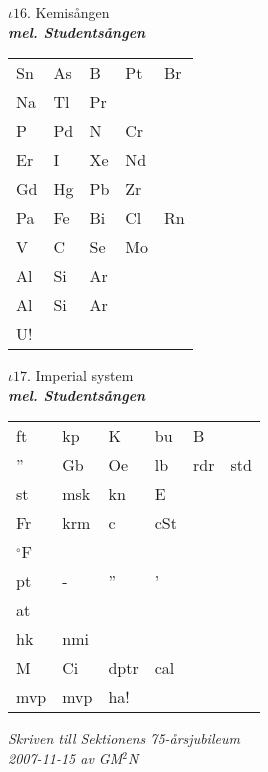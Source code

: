 \documentclass[a6paper,10pt]{article}
\newcommand{\mel}[1]{\small\textbf{\textit{mel. #1 \\}}}
\begin{document}
\begin{center}
\Large $\iota16$. Kemisången \\ 
\mel{Studentsången}
\end{center}
\vspace{-10pt}
\begin{table}[!h]
\begin{tabularx}{0.8\textwidth}{X X X X X}
 Sn&As&B&Pt&Br
\vspace{2pt} \\
 Na & Tl & Pr 
\vspace{2pt} \\
  P & Pd & N & Cr
\vspace{2pt} \\
Er & I & Xe & Nd
\vspace{2pt} \\
Gd&Hg&Pb&Zr
\vspace{2pt} \\
Pa&Fe&Bi&Cl&Rn
\vspace{2pt} \\
V&C&Se&Mo
\vspace{2pt} \\
Al &Si&Ar
\vspace{2pt} \\
Al &Si&Ar
\vspace{2pt} \\
U!
\end{tabularx}
\end{table}
\vspace{-10pt}
\begin{center}
\Large $\iota17$. Imperial system \\ 
\mel{Studentsången}
\end{center}
\vspace{-10pt}
\begin{table}[!h]
\begin{tabularx}{0.8\textwidth}{X X X X X X}
 ft&kp&K&bu&B
\vspace{2pt} \\
 '' &Gb & Oe & lb&rdr&std 
\vspace{2pt} \\
st&msk&kn&E
\vspace{2pt} \\
Fr&krm&c&cSt
\vspace{2pt} \\
$^{\circ}$F
\vspace{2pt} \\
pt&-&''&'
\vspace{2pt} \\
at
\vspace{2pt} \\
hk&nmi \\
M&Ci&dptr&cal
\vspace{2pt} \\
mvp & mvp & ha!
\end{tabularx}
\end{table}
\vspace{-10pt}
\begin{flushright}
\textit{Skriven till Sektionens 75-årsjubileum\\ 2007-11-15 av GM$^2$N}
\end{flushright}
\end{document}

